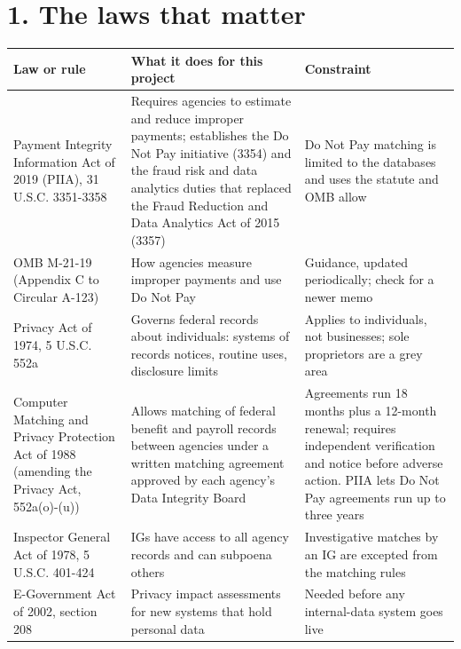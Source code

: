 \documentclass[letterpaper,11pt]{article}
\begin{document}
\hypertarget{the-laws-that-matter}{%
\section*{1. The laws that matter}\label{the-laws-that-matter}}

\begingroup\small\setlength{\tabcolsep}{4pt}\renewcommand{\arraystretch}{1.25}
\begin{longtable}[l]{@{}>{\raggedright\arraybackslash}p{}>{\raggedright\arraybackslash}p{}>{\raggedright\arraybackslash}p{}@{}}
\rowcolor{coolblack}\leavevmode\color{white}\bfseries Law or rule & \leavevmode\color{white}\bfseries What it does for this project & \leavevmode\color{white}\bfseries Constraint \\
\endhead
Payment Integrity Information Act of 2019 (PIIA), 31 U.S.C. 3351-3358 & Requires agencies to estimate and reduce improper payments; establishes the Do Not Pay initiative (3354) and the fraud risk and data analytics duties that replaced the Fraud Reduction and Data Analytics Act of 2015 (3357) & Do Not Pay matching is limited to the databases and uses the statute and OMB allow \\
OMB M-21-19 (Appendix C to Circular A-123) & How agencies measure improper payments and use Do Not Pay & Guidance, updated periodically; check for a newer memo \\
Privacy Act of 1974, 5 U.S.C. 552a & Governs federal records about individuals: systems of records notices, routine uses, disclosure limits & Applies to individuals, not businesses; sole proprietors are a grey area \\
Computer Matching and Privacy Protection Act of 1988 (amending the Privacy Act, 552a(o)-(u)) & Allows matching of federal benefit and payroll records between agencies under a written matching agreement approved by each agency's Data Integrity Board & Agreements run 18 months plus a 12-month renewal; requires independent verification and notice before adverse action. PIIA lets Do Not Pay agreements run up to three years \\
Inspector General Act of 1978, 5 U.S.C. 401-424 & IGs have access to all agency records and can subpoena others & Investigative matches by an IG are excepted from the matching rules \\
E-Government Act of 2002, section 208 & Privacy impact assessments for new systems that hold personal data & Needed before any internal-data system goes live \\

\end{longtable}
\end{document}
